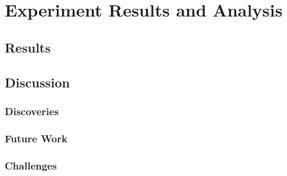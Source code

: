 \chapter{Experiment Results and Analysis}
\label{chapter:results-and-analysis}


\section{Results}
\label{sec:results}


\section{Discussion}
\label{sec:discussion}


\subsection{Discoveries}
\label{subsec:discoveries}


\subsection{Future Work}
\label{subsec:future-work}


\subsection{Challenges}
\label{subsec:challenges}

